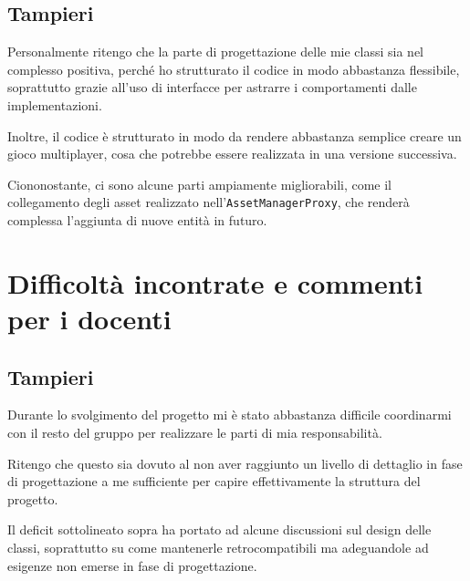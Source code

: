 \documentclass[a4paper,12pt]{report}
\begin{document}
    \subsection{Tampieri}
    \par Personalmente ritengo che la parte di progettazione delle mie classi sia nel complesso positiva, perché
    ho strutturato il codice in modo abbastanza flessibile, soprattutto grazie all'uso di interfacce per astrarre
    i comportamenti dalle implementazioni.
    \par Inoltre, il codice è strutturato in modo da rendere abbastanza semplice creare un gioco multiplayer, cosa
    che potrebbe essere realizzata in una versione successiva.
    \par Ciononostante, ci sono alcune parti ampiamente migliorabili, come il collegamento degli asset realizzato
    nell'\texttt{AssetManagerProxy}, che renderà complessa l'aggiunta di nuove entità in futuro.
    \section{Difficoltà incontrate e commenti per i docenti}
    \subsection{Tampieri}
    \par Durante lo svolgimento del progetto mi è stato abbastanza difficile coordinarmi con il resto del gruppo per
    realizzare le parti di mia responsabilità.
    \par Ritengo che questo sia dovuto al non aver raggiunto un livello di dettaglio in fase di progettazione a me
    sufficiente per capire effettivamente la struttura del progetto.
    \par Il deficit sottolineato sopra ha portato ad alcune discussioni sul design delle classi, soprattutto su come
    mantenerle retrocompatibili ma adeguandole ad esigenze non emerse in fase di progettazione.
    \appendix
\end{document}
